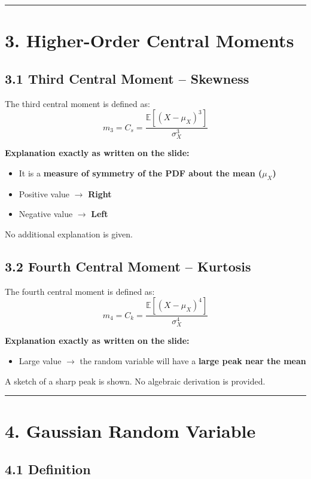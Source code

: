 \documentclass[12pt]{article}
\begin{document}
\hrule
\vspace{1em}

\section*{3. Higher-Order Central Moments}

\subsection*{3.1 Third Central Moment – Skewness}

The third central moment is defined as:
\[
m_3 = C_s =
\frac{\mathbb{E}[(X - \mu_X)^3]}{\sigma_X^3}
\]

\textbf{Explanation exactly as written on the slide:}
\begin{itemize}
    \item It is a \textbf{measure of symmetry of the PDF about the mean ($\mu_X$)}
    \item Positive value $\rightarrow$ \textbf{Right}
    \item Negative value $\rightarrow$ \textbf{Left}
\end{itemize}

No additional explanation is given.

\subsection*{3.2 Fourth Central Moment – Kurtosis}

The fourth central moment is defined as:
\[
m_4 = C_k =
\frac{\mathbb{E}[(X - \mu_X)^4]}{\sigma_X^4}
\]

\textbf{Explanation exactly as written on the slide:}
\begin{itemize}
    \item Large value $\rightarrow$ the random variable will have a \textbf{large peak near the mean}
\end{itemize}

A sketch of a sharp peak is shown. No algebraic derivation is provided.

\hrule
\vspace{1em}

\section*{4. Gaussian Random Variable}

\subsection*{4.1 Definition}
\end{document}

